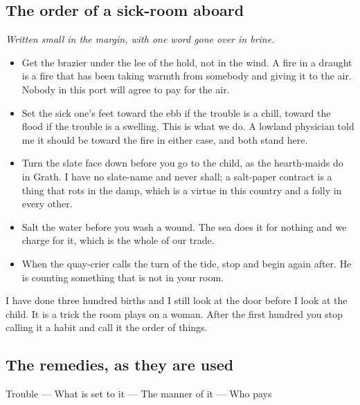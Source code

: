 \documentclass{design/chronicle}
\begin{document}
\subsection*{The order of a sick-room aboard}

\emph{Written small in the margin, with one word gone over in brine.}

\begin{itemize}[leftmargin=1.4em,itemsep=1pt,topsep=3pt,parsep=0pt]

\item Get the brazier under the lee of the hold, not in the wind. A fire in a draught is a fire that has been taking warmth from somebody and giving it to the air. Nobody in this port will agree to pay for the air.

\item Set the sick one’s feet toward the ebb if the trouble is a chill, toward the flood if the trouble is a swelling. This is what we do. A lowland physician told me it should be toward the fire in either case, and both stand here.

\item Turn the slate face down before you go to the child, as the hearth-maids do in Grath. I have no slate-name and never shall; a salt-paper contract is a thing that rots in the damp, which is a virtue in this country and a folly in every other.

\item Salt the water before you wash a wound. The sea does it for nothing and we charge for it, which is the whole of our trade.

\item When the quay-crier calls the turn of the tide, stop and begin again after. He is counting something that is not in your room.

\end{itemize}

I have done three hundred births and I still look at the door before I look at the child. It is a trick the room plays on a woman. After the first hundred you stop calling it a habit and call it the order of things.

\subsection*{The remedies, as they are used}

Trouble — What is set to it — The manner of it — Who pays\par
\end{document}
